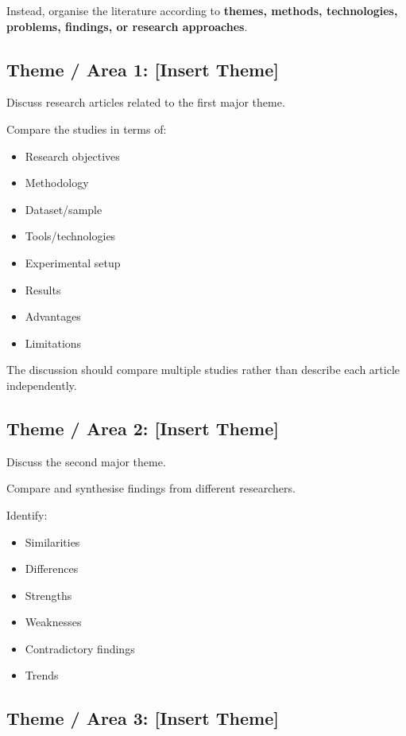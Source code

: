 \documentclass[12pt,a4paper]{article}
\begin{document}
Instead, organise the literature according to \textbf{themes, methods, technologies, problems, findings, or research approaches}.


\subsection{Theme / Area 1: [Insert Theme]}

Discuss research articles related to the first major theme.

Compare the studies in terms of:

\begin{itemize}
    \item Research objectives
    \item Methodology
    \item Dataset/sample
    \item Tools/technologies
    \item Experimental setup
    \item Results
    \item Advantages
    \item Limitations
\end{itemize}

The discussion should compare multiple studies rather than describe each article independently.


\subsection{Theme / Area 2: [Insert Theme]}

Discuss the second major theme.

Compare and synthesise findings from different researchers.

Identify:

\begin{itemize}
    \item Similarities
    \item Differences
    \item Strengths
    \item Weaknesses
    \item Contradictory findings
    \item Trends
\end{itemize}


\subsection{Theme / Area 3: [Insert Theme]}
\end{document}
